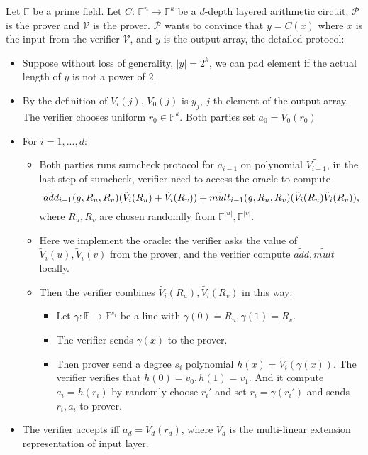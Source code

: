 \begin{protocol}
	\label{protocol::CMT}
	Let $\mathbb{F}$ be a prime field. Let $C$: $\mathbb{F}^n\rightarrow \mathbb{F}^k$ be a $d$-depth layered arithmetic circuit. $\mathcal{P}$ is the prover and $\mathcal{V}$ is the prover. $\mathcal{P}$ wants to convince that $y=C(x)$ where $x$ is the input from the verifier $\mathcal{V}$, and $y$ is the output array, the detailed protocol:

	\begin{itemize}
		\item Suppose without loss of generality, $|y|=2^k$, we can pad element if the actual length of $y$ is not a power of $2$.
		\item By the definition of $V_i(j)$, $V_0(j)$ is $y_j$, $j$-th element of the output array. The verifier chooses uniform $r_0 \in \mathbb{F}^k$. Both parties set $a_0=\tilde{V_0}(r_0)$
		\item For $i=1,...,d$:
		\begin{itemize}
			\item Both parties runs sumcheck protocol for $a_{i-1}$ on polynomial $\tilde{V_{i-1}}$, in the last step of sumcheck, verifier need to access the oracle to compute $$\tilde{add}_{i-1}(g, R_{u}, R_{v})(\tilde{V}_{i}(R_{u})+\tilde{V}_{i}(R_v))+\tilde{mult}_{i-1}(g, R_{u}, R_{v})(\tilde{V}_{i}(R_{u})\tilde{V}_{i}(R_v))\textnormal{,}$$ 
			where $R_{u}, R_{v}$ are chosen randomlly from $\mathbb{F}^{|u|},\mathbb{F}^{|v|}$. 

			\item Here we implement the oracle: the verifier asks the value of $\tilde{V}_i(u), \tilde{V}_i(v)$ from the prover, and the verifier compute $\tilde{add}, \tilde{mult}$ locally. 
			\item Then the verifier combines $\tilde{V_{i}}(R_{u}), \tilde{V_{i}}(R_{v})$ in this way: 
			\begin{itemize}
				\item Let $\gamma: \mathbb{F} \rightarrow \mathbb{F}^{s_i}$ be a line with $\gamma(0)=R_{u}, \gamma(1)=R_{v}$. 
				\item The verifier sends $\gamma(x)$ to the prover. 
				\item Then prover send a degree $s_i$ polynomial $h(x)=\tilde{V_{i}}(\gamma(x))$. The verifier verifies that $h(0)=v_0, h(1)=v_1$. And it compute $a_i=h(r_i)$ by randomly choose $r_i'$ and set $r_i=\gamma(r_i')$ and sends $r_i, a_i$ to prover.
			\end{itemize}
		\end{itemize}
		\item The verifier accepts iff $a_d = \tilde{V_d}(r_d)$, where $\tilde{V_d}$ is the multi-linear extension representation of input layer.
	\end{itemize}
\end{protocol}

